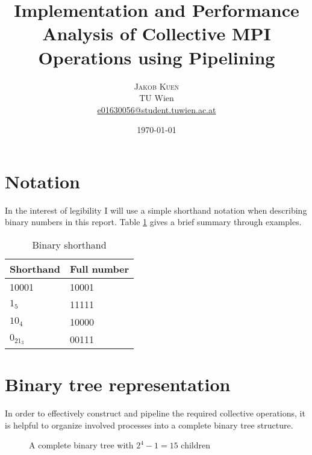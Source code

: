 \documentclass[twoside,twocolumn,hidelinks]{article}
\title{Implementation and Performance Analysis of Collective MPI Operations using Pipelining} %
\author{%
\textsc{Jakob Kuen} \\[1ex] %
\normalsize TU Wien \\ %
\normalsize \href{mailto:e01630056@student.tuwien.ac.at}{e01630056@student.tuwien.ac.at} %
}
\date{\today} %
\begin{document}
\nocite{*}

\maketitle


\section*{Notation}
In the interest of legibility I will use a simple shorthand notation when describing binary numbers in this report. Table \ref{tab:binary_shorthand} gives a brief summary through examples.

\begin{table}[h]
      \centering
      \begin{tabular}{ll}
            \toprule
            Shorthand & Full number \\
            \midrule
            10001    & 10001 \\
            $1_5$    & 11111  \\
            $10_4$   & 10000  \\
            $0_21_3$ & 00111  \\
            \bottomrule
      \end{tabular}
      \caption{Binary shorthand}
      \label{tab:binary_shorthand}
\end{table}

\section*{Binary tree representation}\label{sec:binary_tree}
In order to effectively construct and pipeline the required collective operations, it is helpful to organize involved processes into a complete binary tree structure. 

\begin{figure}
      \centering
      \caption{A complete binary tree with $2^4-1 = 15$ children}
      \label{fig:tree_inorder}
\end{figure}
\end{document}
